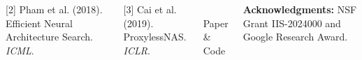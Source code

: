 \documentclass[25pt, a0paper, portrait, margin=15mm,
    innermargin=15mm, blockverticalspace=12mm, colspace=20mm]{tikzposter}
\begin{document}
\begin{columns}
{{        [2] Pham et al. (2018). Efficient Neural Architecture Search. \textit{ICML}.

        [3] Cai et al. (2019). ProxylessNAS. \textit{ICLR}.
        }

        \vspace{1em}
        \begin{center}
        \\[0.5em]
        {\normalsize Paper \& Code}
        \end{center}

        \vspace{0.5em}
        {\small \textbf{Acknowledgments:} NSF Grant IIS-2024000 and Google Research Award.}
    }

\end{columns}
\end{document}
